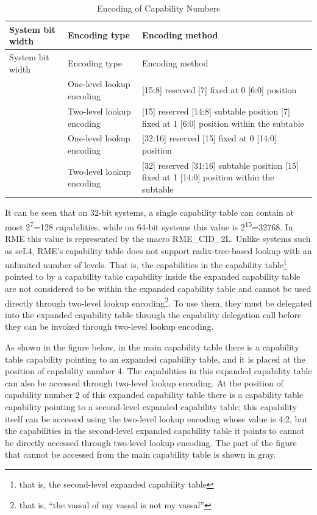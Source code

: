 \begin{xltabular}{\textwidth}{@{}>{\hsize\raggedright\arraybackslash}X>{\hsize\raggedright\arraybackslash}X>{\hsize\raggedright\arraybackslash}X@{}}
\caption{Encoding of Capability Numbers}\label{tab:2-2-capability-number-encoding}\\
\toprule
System bit width & Encoding type & Encoding method\tabularnewline
\endfirsthead
\toprule
System bit width & Encoding type & Encoding method\tabularnewline
\midrule
\endhead
\bottomrule
\endlastfoot
{} & One-level lookup encoding & {[}15:8{]} reserved {[}7{]} fixed at 0
{[}6:0{]} position\tabularnewline
& Two-level lookup encoding & {[}15{]} reserved {[}14:8{]} subtable position {[}7{]} fixed at 1
{[}6:0{]} position within the subtable\tabularnewline
{} & One-level lookup encoding & {[}32:16{]} reserved {[}15{]} fixed at 0
{[}14:0{]} position\tabularnewline
& Two-level lookup encoding & {[}32{]} reserved {[}31:16{]} subtable position {[}15{]} fixed at 1
{[}14:0{]} position within the subtable\tabularnewline
\end{xltabular}
\nopagebreak[4]

It can be seen that on 32-bit systems, a single capability table can contain at most 2\textsuperscript{7}=128 capabilities, while on 64-bit systems this value is 2\textsuperscript{15}=32768. In RME this value is represented by the macro RME\_CID\_2L. Unlike systems such as seL4, RME's capability table does not support radix-tree-based lookup with an unlimited number of levels. That is, the capabilities in the capability table\footnote{that is, the second-level expanded capability table} pointed to by a capability table capability inside the expanded capability table are not considered to be within the expanded capability table and cannot be used directly through two-level lookup encoding\footnote{that is, ``the vassal of my vassal is not my vassal''}. To use them, they must be delegated into the expanded capability table through the capability delegation call before they can be invoked through two-level lookup encoding.

As shown in the figure below, in the main capability table there is a capability table capability pointing to an expanded capability table, and it is placed at the position of capability number 4. The capabilities in this expanded capability table can also be accessed through two-level lookup encoding. At the position of capability number 2 of this expanded capability table there is a capability table capability pointing to a second-level expanded capability table; this capability itself can be accessed using the two-level lookup encoding whose value is 4:2, but the capabilities in the second-level expanded capability table it points to cannot be directly accessed through two-level lookup encoding. The part of the figure that cannot be accessed from the main capability table is shown in gray.

